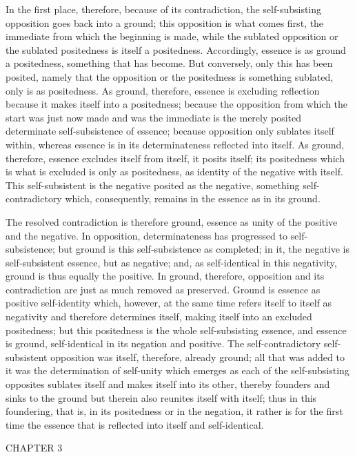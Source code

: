 In the first place, therefore, because of its contradiction,
the self-subsisting opposition goes back into a ground;
this opposition is what comes first,
the immediate from which the beginning is made,
while the sublated opposition
or the sublated positedness is itself a positedness.
Accordingly, essence is as ground a positedness,
something that has become.
But conversely, only this has been posited,
namely that the opposition or the positedness is
something sublated, only is as positedness.
As ground, therefore, essence is excluding reflection
because it makes itself into a positedness;
because the opposition from which the start
was just now made and was the immediate is
the merely posited determinate self-subsistence of essence;
because opposition only sublates itself within,
whereas essence is in its determinateness reflected into itself.
As ground, therefore, essence excludes
itself from itself, it posits itself;
its positedness which is what is excluded
is only as positedness,
as identity of the negative with itself.
This self-subsistent is the negative
posited as the negative,
something self-contradictory
which, consequently, remains in
the essence as in its ground.

The resolved contradiction is therefore ground,
essence as unity of the positive and the negative.
In opposition, determinateness has progressed to self-subsistence;
but ground is this self-subsistence as completed;
in it, the negative is self-subsistent essence, but as negative;
and, as self-identical in this negativity,
ground is thus equally the positive.
In ground, therefore, opposition and its contradiction
are just as much removed as preserved.
Ground is essence as positive self-identity
which, however, at the same time
refers itself to itself as negativity
and therefore determines itself,
making itself into an excluded positedness;
but this positedness is the whole self-subsisting essence,
and essence is ground, self-identical in its negation and positive.
The self-contradictory self-subsistent opposition
was itself, therefore, already ground;
all that was added to it was the determination of self-unity
which emerges as each of the self-subsisting opposites
sublates itself and makes itself into its other,
thereby founders and sinks to the ground
but therein also reunites itself with itself;
thus in this foundering, that is,
in its positedness or in the negation,
it rather is for the first time the essence
that is reflected into itself and self-identical.

CHAPTER 3

